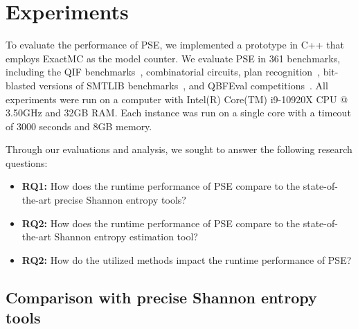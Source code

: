 \section{Experiments}
\label{sec:Experiments}

To evaluate the performance of PSE, we implemented a prototype in C++ that employs ExactMC as the model counter.
We evaluate PSE in 361 benchmarks, including the QIF  benchmarks~\cite{fremont2017maximum}, combinatorial circuits, plan recognition~\cite{soos2020tinted}, bit-blasted versions of SMTLIB benchmarks~\cite{sharma2019ganak}, and QBFEval competitions~\cite{golia2022scalable}. %
All experiments were run on a computer with Intel(R) Core(TM) i9-10920X CPU @ 3.50GHz and 32GB RAM.
Each instance was run on a single core with a timeout of 3000 seconds and 8GB memory.


Through our evaluations and analysis, we sought to answer the following research questions:
\begin{itemize}
	\item \textbf{RQ1:} How does the runtime performance of PSE compare to the state-of-the-art precise Shannon entropy tools?
	\item \textbf{RQ2:} How does the runtime performance of PSE compare to the state-of-the-art Shannon entropy estimation tool?
	\item \textbf{RQ2:} How do the utilized methods impact the runtime performance of PSE? 
\end{itemize}


\subsection{Comparison with precise Shannon entropy tools}

